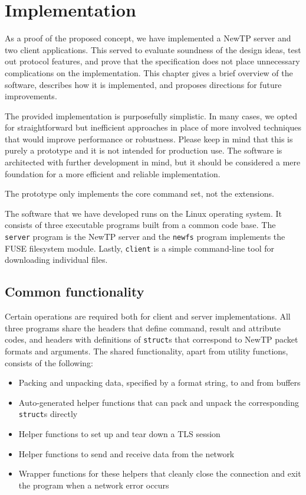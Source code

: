 
\chapter{Implementation}

As a proof of the proposed concept, we have implemented a NewTP server and two client applications. This
served to evaluate soundness of the design ideas, test out protocol features, and prove that the specification
does not place unnecessary complications on the implementation. This chapter gives a brief overview of the
software, describes how it is implemented, and proposes directions for future improvements.

The provided implementation is purposefully simplistic. In many cases, we opted for straightforward but
inefficient approaches in place of more involved techniques that would improve performance or robustness.
Please keep in mind that this is purely a prototype and it is not intended for production use. The software is
architected with further development in mind, but it should be considered a mere foundation for a more
efficient and reliable implementation.

The prototype only implements the core command set, not the extensions.

The software that we have developed runs on the Linux operating system. It consists of three executable
programs built from a common code base. The {\tt server} program is the NewTP server and the {\tt newfs}
program implements the FUSE filesystem module. Lastly, {\tt client} is a simple command-line tool for
downloading individual files.

\section{Common functionality}

Certain operations are required both for client and server implementations. All three programs share the
headers that define command, result and attribute codes, and headers with definitions of {\tt struct}s that
correspond to NewTP packet formats and arguments. The shared functionality, apart from utility functions,
consists of the following:
\begin{itemize}[nolistsep]
	\item Packing and unpacking data, specified by a format string, to and from buffers
	\item Auto-generated helper functions that can pack and unpack the corresponding {\tt struct}s
		directly
	\item Helper functions to set up and tear down a TLS session
	\item Helper functions to send and receive data from the network
	\item Wrapper functions for these helpers that cleanly close the connection and exit the program
		when a network error occurs
\end{itemize}

